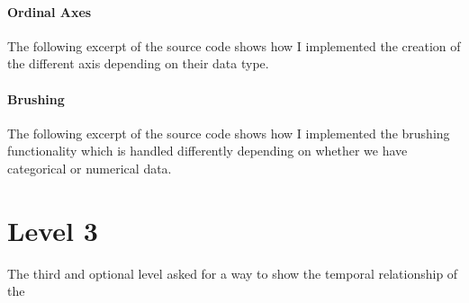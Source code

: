 \documentclass[]{article}
\begin{document}
\paragraph{Ordinal Axes} The following excerpt of the source code shows how I implemented the creation of the different axis depending on their data type. 


\paragraph{Brushing} The following excerpt of the source code shows how I implemented the brushing functionality which is handled differently depending on whether we have categorical or numerical data. 




\section*{Level 3}
The third and optional level asked for a way to show the temporal relationship of the 
\end{document}
